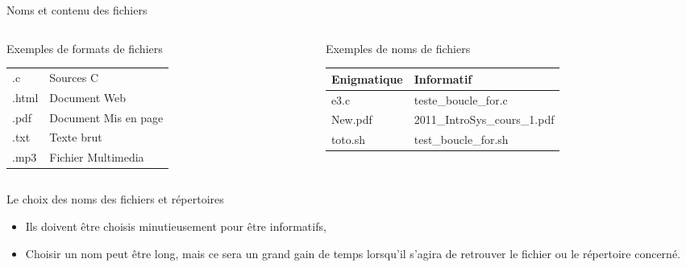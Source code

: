 \begin{frame}{Noms et contenu des fichiers}
\begin{columns}
\begin{column}{5.5cm}
\begin{block}{Exemples de formats de fichiers}
\begin{center}
\begin{tabular}{ll}
            .c&Sources C\\
            .html&Document Web\\
            .pdf&Document Mis en page\\
            .txt&Texte brut\\
            .mp3&Fichier Multimedia\\
            \hline
          \end{tabular}
        \end{center}
      \end{block}
    \end{column}
    \begin{column}{5.5cm}
      \begin{block}{Exemples de noms de fichiers}
        \begin{center}
          \begin{tabular}{ll}
            \hline
            Enigmatique&Informatif\\
            \hline
            e3.c&teste\_boucle\_for.c\\
            New.pdf&2011\_IntroSys\_cours\_1.pdf\\
            toto.sh&test\_boucle\_for.sh\\
            \hline
          \end{tabular}
        \end{center}
      \end{block}
      \vrule
    \end{column}
  \end{columns}
  \begin{alertblock}{Le choix des noms des fichiers et répertoires}
    \begin{itemize}
    \item Ils doivent être choisis minutieusement pour être informatifs,
    \item Choisir un nom peut être long, mais ce sera un grand gain de temps lorsqu'il s'agira de retrouver le fichier ou le répertoire concerné.
    \end{itemize}
  \end{alertblock}
\end{frame}
